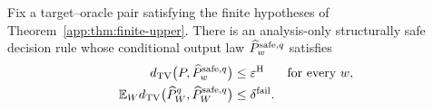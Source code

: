 \begin{lemma}
\label{app:lem:safe-controller-comparison}
Fix a target--oracle pair satisfying the finite hypotheses of
Theorem~\ref{app:thm:finite-upper}.  There is an analysis-only structurally
safe decision rule whose conditional output law
$\widehat P_{w}^{\mathrm{safe},q}$ satisfies
\begin{align}
 d_{\mathrm{TV}}\bigl(P,
       \widehat P_{w}^{\mathrm{safe},q}\bigr)
 &\le \varepsilon^{\mathrm H}
 &&\text{for every }w,
 \label{app:eq:safe-seedwise-TV}\\
 \mathbb E_{W}
 d_{\mathrm{TV}}\bigl(
   \widehat P_{W}^{q},
   \widehat P_{W}^{\mathrm{safe},q}
 \bigr)
 &\le\delta^{\mathrm{fail}}.
 \label{app:eq:implemented-safe-TV}
\end{align}
\end{lemma}

